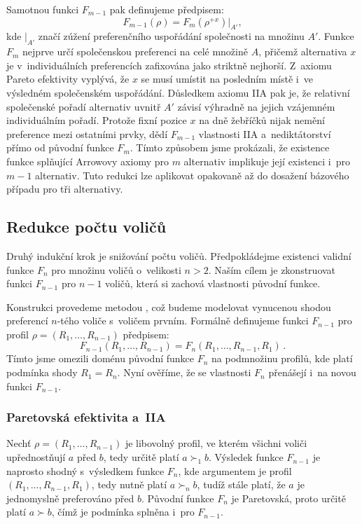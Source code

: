 \documentclass[a4paper, 11pt]{article}
\begin{document}
Samotnou funkci $F_{m-1}$ pak definujeme předpisem:
\[
    F_{m-1}(\rho) = F_m(\rho^{+x})|_{A'},
\]
kde $|_{A'}$ značí zúžení preferenčního uspořádání společnosti na množinu $A'$.
Funkce $F_m$ nejprve určí společenskou preferenci na celé množině $A$, přičemž alternativa $x$ je v~individuálních preferencích zafixována jako striktně nejhorší.
Z~axiomu Pareto efektivity vyplývá, že $x$ se musí umístit na posledním místě i~ve výsledném společenském uspořádání.
Důsledkem axiomu IIA pak je, že relativní společenské pořadí alternativ uvnitř $A'$ závisí výhradně na jejich vzájemném individuálním pořadí.
Protože fixní pozice $x$ na dně žebříčků nijak nemění preference mezi ostatními prvky, dědí $F_{m-1}$ vlastnosti IIA a~nediktátorství přímo od původní funkce $F_m$.
Tímto způsobem jsme prokázali, že existence funkce splňující Arrowovy axiomy pro $m$ alternativ implikuje její existenci i~pro $m-1$ alternativ.
Tuto redukci lze aplikovat opakovaně až do dosažení bázového případu pro tři alternativy.
\subsection{Redukce počtu voličů}

Druhý indukční krok je snižování počtu voličů.
Předpokládejme existenci validní funkce $F_n$ pro množinu voličů o~velikosti $n > 2$.
Naším cílem je zkonstruovat funkci $F_{n-1}$ pro $n-1$ voličů, která si zachová vlastnosti původní funkce.

Konstrukci provedeme metodou , což budeme modelovat vynucenou shodou preferencí $n$-tého voliče s~voličem prvním.
Formálně definujeme funkci $F_{n-1}$ pro profil $\rho = (R_1, \dots, R_{n-1})$ předpisem:
\[
    F_{n-1}(R_1, \dots, R_{n-1}) = F_n(R_1, \dots, R_{n-1}, R_1)\,.
\]
Tímto jsme omezili doménu původní funkce $F_n$ na podmnožinu profilů, kde platí podmínka shody $R_1 = R_n$.
Nyní ověříme, že se vlastnosti $F_n$ přenášejí i~na novou funkci $F_{n-1}$.

\subsubsection*{Paretovská efektivita a~IIA}
Nechť $\rho = (R_1, \dots, R_{n-1})$ je libovolný profil, ve kterém všichni voliči upřednostňují $a$ před $b$, tedy určitě platí $a \succ_1 b$.
Výsledek funkce $F_{n-1}$ je naprosto shodný s~výsledkem funkce $F_n$, kde argumentem je profil $(R_1, \dots, R_{n-1}, R_1)$, tedy nutně platí $a \succ_n b$, tudíž stále platí, že $a$ je jednomyslně preferováno před $b$.
Původní funkce $F_n$ je Paretovská, proto určitě platí $a \succ b$, čímž je podmínka splněna i~pro $F_{n-1}$.
\end{document}
